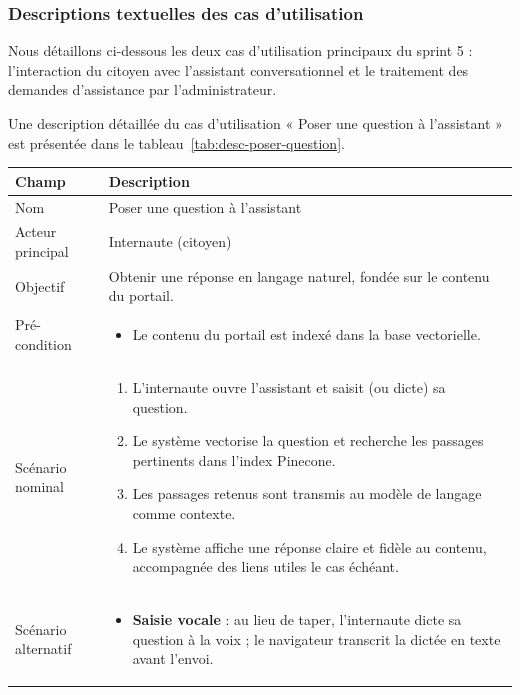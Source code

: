 \subsubsection{Descriptions textuelles des cas d'utilisation}
Nous détaillons ci-dessous les deux cas d'utilisation principaux du sprint 5 : l'interaction du citoyen avec l'assistant conversationnel et le traitement des demandes d'assistance par l'administrateur.

 Une description détaillée du cas d'utilisation « Poser une question à l'assistant » est présentée dans le tableau~\ref{tab:desc-poser-question}.

\renewcommand{\arraystretch}{1.3}

\begin{longtable}{|p{4cm}|p{12cm}|}

\hline
\textbf{Champ} & \textbf{Description} \\ \hline
\endfirsthead

 

Nom & Poser une question à l'assistant \\ \hline

Acteur principal & Internaute (citoyen) \\ \hline

Objectif & Obtenir une réponse en langage naturel, fondée sur le contenu du portail. \\ \hline

Pré-condition &
\begin{itemize}
    \item Le contenu du portail est indexé dans la base vectorielle.
\end{itemize}
\\ \hline

Scénario nominal &
\begin{enumerate}
\item L'internaute ouvre l'assistant et saisit (ou dicte) sa question.
\item Le système vectorise la question et recherche les passages pertinents dans l'index Pinecone.
\item Les passages retenus sont transmis au modèle de langage comme contexte.
\item Le système affiche une réponse claire et fidèle au contenu, accompagnée des liens utiles le cas échéant.
\end{enumerate}
\\ \hline

Scénario alternatif &
\begin{itemize}
\item \textbf{Saisie vocale} : au lieu de taper, l'internaute dicte sa question à la voix ; le navigateur transcrit la dictée en texte avant l'envoi.


\end{itemize}
\end{longtable}
